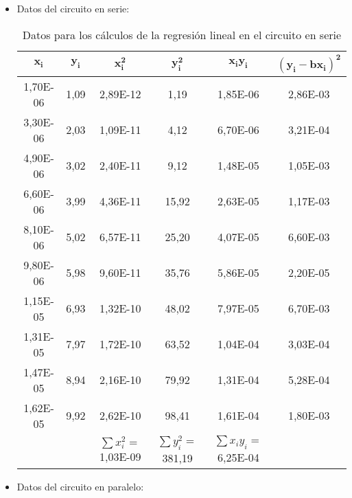 \documentclass[a4paper,12pt,titlepage]{article}
\begin{document}
\begin{itemize}
    \item Datos del circuito en serie:
    \begin{table}[h!]
        \centering
        \begin{tabular}{|c|c|c|c|c|c|}
        \hline
        $\mathbf{x_{i}}$ & $\mathbf{y_{i}}$ & $\mathbf{x_ {i}^2}$ & $\mathbf{y_{i}^2}$ & $\mathbf{x_{i}y_{i}}$  & $\mathbf{(y_{i}-bx_{i})^2}$ \\ \hline
        1,70E-06 & 1,09 & 2,89E-12    & 1,19   & 1,85E-06 & 2,86E-03 \\ \hline
        3,30E-06 & 2,03 & 1,09E-11   & 4,12   & 6,70E-06 & 3,21E-04 \\ \hline
        4,90E-06 & 3,02 & 2,40E-11   & 9,12   & 1,48E-05 & 1,05E-03 \\ \hline
        6,60E-06 & 3,99 & 4,36E-11   & 15,92  & 2,63E-05 & 1,17E-03 \\ \hline
        8,10E-06 & 5,02 & 6,57E-11   & 25,20  & 4,07E-05 & 6,60E-03 \\ \hline
        9,80E-06 & 5,98 & 9,60E-11   & 35,76  & 5,86E-05 & 2,20E-05 \\ \hline
        1,15E-05 & 6,93 & 1,32E-10  & 48,02  & 7,97E-05 & 6,70E-03 \\ \hline
        1,31E-05 & 7,97 & 1,72E-10  & 63,52  & 1,04E-04 & 3,03E-04 \\ \hline
        1,47E-05 & 8,94 & 2,16E-10  & 79,92  & 1,31E-04 & 5,28E-04 \\ \hline
        1,62E-05 & 9,92 & 2,62E-10  & 98,41  & 1,61E-04 & 1,80E-03 \\ \hline
                 &      & $\sum x_{i}^2=$1,03E-09 & $\sum y_{i}^2=$381,19 & $\sum x_{i}y_{i}=$6,25E-04 &          \\ \hline
        \end{tabular}
        \caption{Datos para los cálculos de la regresión lineal en el circuito en serie}
        \label{tab:my-table}
    \end{table}

    \newpage
    \item Datos del circuito en paralelo:


\end{itemize}
\end{document}
